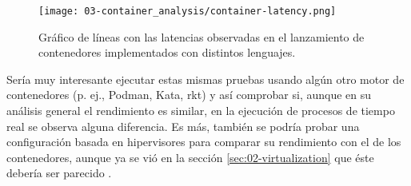\begin{figure}
    \centering
    \texttt{[image: 03-container\_analysis/container-latency.png]}
    \caption{Gráfico de líneas con las latencias observadas en el lanzamiento de
        contenedores implementados con distintos lenguajes.}
    \label{fig:03-container_latency}
\end{figure}

Sería muy interesante ejecutar estas mismas pruebas usando algún otro motor de
contenedores (p. ej., Podman, Kata, rkt) y así comprobar si, aunque en su
análisis general el rendimiento es similar, en la ejecución de procesos de
tiempo real se observa alguna diferencia. Es más, también se podría probar una
configuración basada en hipervisores para comparar su rendimiento con el de los
contenedores, aunque ya se vió en la sección \ref{sec:02-virtualization} que
éste debería ser parecido \cite{manco_my_2017} \cite{felter_updated_2015}.